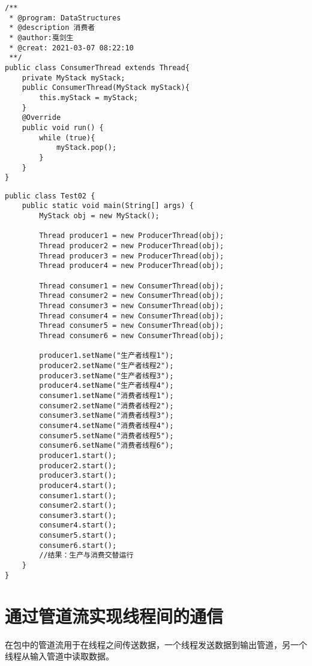 \documentclass[a4paper]{report}
\begin{document}
\begin{lstlisting}[title = 消费者]
/**
 * @program: DataStructures
 * @description 消费者
 * @author:戛剑生
 * @creat: 2021-03-07 08:22:10
 **/
public class ConsumerThread extends Thread{
    private MyStack myStack;
    public ConsumerThread(MyStack myStack){
        this.myStack = myStack;
    }
    @Override
    public void run() {
        while (true){
            myStack.pop();
        }
    }
}
\end{lstlisting}
\begin{lstlisting}[title=多生产者多消费者模型测试]
public class Test02 {
    public static void main(String[] args) {
        MyStack obj = new MyStack();

        Thread producer1 = new ProducerThread(obj);
        Thread producer2 = new ProducerThread(obj);
        Thread producer3 = new ProducerThread(obj);
        Thread producer4 = new ProducerThread(obj);

        Thread consumer1 = new ConsumerThread(obj);
        Thread consumer2 = new ConsumerThread(obj);
        Thread consumer3 = new ConsumerThread(obj);
        Thread consumer4 = new ConsumerThread(obj);
        Thread consumer5 = new ConsumerThread(obj);
        Thread consumer6 = new ConsumerThread(obj);

        producer1.setName("生产者线程1");
        producer2.setName("生产者线程2");
        producer3.setName("生产者线程3");
        producer4.setName("生产者线程4");
        consumer1.setName("消费者线程1");
        consumer2.setName("消费者线程2");
        consumer3.setName("消费者线程3");
        consumer4.setName("消费者线程4");
        consumer5.setName("消费者线程5");
        consumer6.setName("消费者线程6");
        producer1.start();
        producer2.start();
        producer3.start();
        producer4.start();
        consumer1.start();
        consumer2.start();
        consumer3.start();
        consumer4.start();
        consumer5.start();
        consumer6.start();
        //结果：生产与消费交替运行
    }
}
\end{lstlisting}
\section{通过管道流实现线程间的通信}
在包中的管道流用于在线程之间传送数据，一个线程发送数据到输出管道，另一个线程从输入管道中读取数据。
\end{document}
